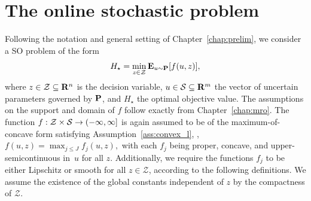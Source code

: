 \section{The online stochastic problem}
\label{sec:problem_intro}
Following the notation and general setting of Chapter~\ref{chap:prelim}, we consider a \gls{SO} problem of the form
\begin{equation}
\label{eq:opt}
 H_\star  = \min_{z\in \mathcal{Z}} \mathbf{E}_{u \sim \mathbf{P}}[f(u,z)],
\end{equation}
where $z \in \mathcal{Z} \subseteq {\mathbf R}^n$ is the decision variable, $u \in \mathcal{S} \subseteq {\mathbf R}^m$ the vector of uncertain parameters governed by ${\mathbf P}$, and $H_\star$ the optimal objective value.
The assumptions on the support and domain of $f$ follow exactly from Chapter~\ref{chap:mro}.
The function $f:\mathcal{Z}\times \mathcal{S} \rightarrow (-\infty, \infty]$ is again assumed to be of the maximum-of-concave form satisfying Assumption~\ref{ass:convex_l}, \ie,
$f(u, z) = \max_{j\leq J}f_j(u,z),$
with each $f_j$ being proper, concave, and upper-semicontinuous in~$u$ for all $z$.
Additionally, we require the functions $f_j$ to be either Lipschitz or smooth for all $z \in \mathcal{Z}$, according to the following definitions. We assume the existence of the global constants independent of $z$ by the compactness of $\mathcal{Z}$.
